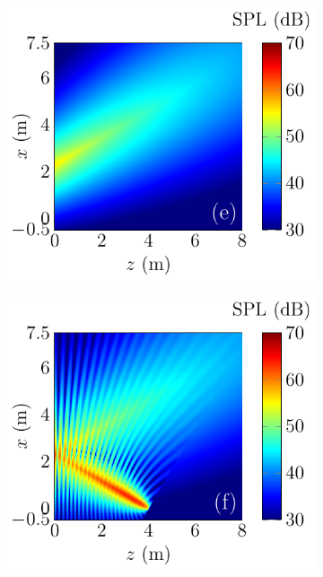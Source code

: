 \begin{figure}[!htb]
\begin{subfigure}{0.32\textwidth}
    \end{subfigure}
    \begin{subfigure}{0.32\textwidth}
        \centering
        \includegraphics[width = \textwidth]{fig/ComputePalReflectionTruncated_Ultra60000_LocSurface4m_Image_211013R.pdf}
    \end{subfigure}
    \begin{subfigure}{0.32\textwidth}
        \centering
        \includegraphics[width = \textwidth]{fig/ComputePalReflectionTruncated_Ultra60000_LocSurface4m_Total_211013S.pdf}

\end{subfigure}
\end{figure}
